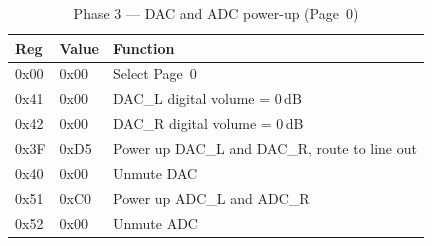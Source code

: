 \begin{table}[H]
    \centering
    \caption{Phase 3 — DAC and ADC power-up (Page~0)}
    \label{tab:codec-regs-p0-powerup}
    \small
    \begin{tabular}{llp{9cm}}
        \toprule
        \textbf{Reg} & \textbf{Value} & \textbf{Function} \\
        \midrule
        0x00 & 0x00 & Select Page~0 \\
        0x41 & 0x00 & DAC\_L digital volume = 0\,dB \\
        0x42 & 0x00 & DAC\_R digital volume = 0\,dB \\
        0x3F & 0xD5 & Power up DAC\_L and DAC\_R, route to line out \\
        0x40 & 0x00 & Unmute DAC \\
        0x51 & 0xC0 & Power up ADC\_L and ADC\_R \\
        0x52 & 0x00 & Unmute ADC \\
        \bottomrule
    \end{tabular}
\end{table}
